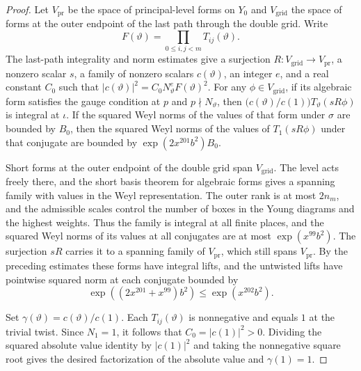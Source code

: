 \begin{proof}
Let $V_{\mathrm{pr}}$ be the space of principal-level forms on $Y_0$ and $V_{\mathrm{grid}}$ the space of forms at the outer endpoint of the last path through the double grid. Write
\[
 F(\vartheta)=\prod_{0\le i,j<m}T_{ij}(\vartheta).
\]
The last-path integrality and norm estimates give a surjection $R\colon V_{\mathrm{grid}}\to V_{\mathrm{pr}}$, a nonzero scalar $s$, a family of nonzero scalars $c(\vartheta)$, an integer $e$, and a real constant $C_0$ such that $|c(\vartheta)|^2=C_0 N_\vartheta^e F(\vartheta)^2$. For any $\phi\in V_{\mathrm{grid}}$, if its algebraic form satisfies the gauge condition at $p$ and $p\nmid N_\vartheta$, then $\bigl(c(\vartheta)/c(1)\bigr)T_\vartheta(sR\phi)$ is integral at $\iota$. If the squared Weyl norms of the values of that form under $\sigma$ are bounded by $B_0$, then the squared Weyl norms of the values of $T_1(sR\phi)$ under that conjugate are bounded by $\exp(2x^{201}b^2)B_0$.

Short forms at the outer endpoint of the double grid span $V_{\mathrm{grid}}$. The level acts freely there, and the short basis theorem for algebraic forms gives a spanning family with values in the Weyl representation. The outer rank is at most $2n_m$, and the admissible scales control the number of boxes in the Young diagrams and the highest weights. Thus the family is integral at all finite places, and the squared Weyl norms of its values at all conjugates are at most $\exp(x^{99}b^2)$. The surjection $sR$ carries it to a spanning family of $V_{\mathrm{pr}}$, which still spans $V_{\mathrm{pr}}$. By the preceding estimates these forms have integral lifts, and the untwisted lifts have pointwise squared norm at each conjugate bounded by
\[
 \exp((2x^{201}+x^{99})b^2)\le \exp(x^{202}b^2).
\]

Set $\gamma(\vartheta)=c(\vartheta)/c(1)$. Each $T_{ij}(\vartheta)$ is nonnegative and equals $1$ at the trivial twist. Since $N_1=1$, it follows that $C_0=|c(1)|^2>0$. Dividing the squared absolute value identity by $|c(1)|^2$ and taking the nonnegative square root gives the desired factorization of the absolute value and $\gamma(1)=1$.


\end{proof}
